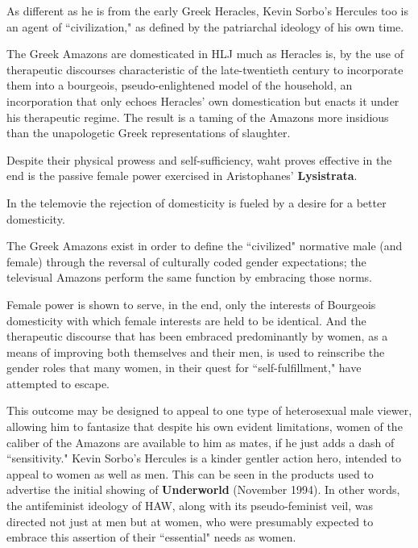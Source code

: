 \begin{nte}
    As different as he is from the early Greek Heracles, Kevin Sorbo's Hercules too is an agent of ``civilization," as defined by the patriarchal ideology of his own time.
\end{nte}

The Greek Amazons are domesticated in HLJ much as Heracles is, by the use of therapeutic discourses characteristic of the late-twentieth century to incorporate them into a bourgeois, pseudo-enlightened model of the household, an incorporation that only echoes Heracles' own domestication but enacts it under his therapeutic regime. The result is a taming of the Amazons more insidious than the unapologetic Greek representations of slaughter.

\begin{rmk}
    Despite their physical prowess and self-sufficiency, waht proves effective in the end is the passive female power exercised in Aristophanes' \textbf{Lysistrata}.
\end{rmk}

In the telemovie the rejection of domesticity is fueled by a desire for a better domesticity. 

\begin{nte}
    The Greek Amazons exist in order to define the ``civilized" normative male (and female) through the reversal of culturally coded gender expectations; the televisual Amazons perform the same function by embracing those norms.
\end{nte}

Female power is shown to serve, in the end, only the interests of Bourgeois domesticity with which female interests are held to be identical. And the therapeutic discourse that has been embraced predominantly by women, as a means of improving both themselves and their men, is used to reinscribe the gender roles that many women, in their quest for ``self-fulfillment," have attempted to escape.

This outcome may be designed to appeal to one type of heterosexual male viewer, allowing him to fantasize that despite his own evident limitations, women of the caliber of the Amazons are available to him as mates, if he just adds a dash of ``sensitivity." Kevin Sorbo's Hercules is a kinder gentler action hero, intended to appeal to women as well as men. This can be seen in the products used to advertise the initial showing of \textbf{Underworld} (November 1994). In other words, the antifeminist ideology of HAW, along with its pseudo-feminist veil, was directed not just at men but at women, who were presumably expected to embrace this assertion of their ``essential" needs as women.

